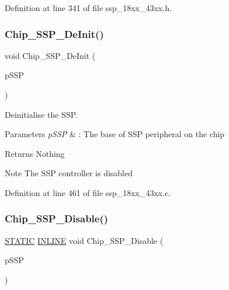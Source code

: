 Definition at line 341 of file ssp\+\_\+18xx\+\_\+43xx.\+h.

\mbox{\label{group___s_s_p__18_x_x__43_x_x_ga48f87506f2fddc1043606eae292b6f16}} 
\subsubsection{\texorpdfstring{Chip\+\_\+\+S\+S\+P\+\_\+\+De\+Init()}{Chip\_SSP\_DeInit()}}
{\footnotesize\ttfamily void Chip\+\_\+\+S\+S\+P\+\_\+\+De\+Init (\begin{DoxyParamCaption}\item[{\hyperlink{struct_l_p_c___s_s_p___t}{L\+P\+C\+\_\+\+S\+S\+P\+\_\+T} $\ast$}]{p\+S\+SP }\end{DoxyParamCaption})}



Deinitialise the S\+SP. 


\begin{DoxyParams}{Parameters}
{\em p\+S\+SP} & \+: The base of S\+SP peripheral on the chip \\
\hline
\end{DoxyParams}
\begin{DoxyReturn}{Returns}
Nothing 
\end{DoxyReturn}
\begin{DoxyNote}{Note}
The S\+SP controller is disabled 
\end{DoxyNote}


Definition at line 461 of file ssp\+\_\+18xx\+\_\+43xx.\+c.

\mbox{\label{group___s_s_p__18_x_x__43_x_x_ga3033c296868595a01dd74ecccaed6090}} 
\subsubsection{\texorpdfstring{Chip\+\_\+\+S\+S\+P\+\_\+\+Disable()}{Chip\_SSP\_Disable()}}
{\footnotesize\ttfamily \hyperlink{group___l_p_c___types___public___macros_ga10b2d890d871e1489bb02b7e70d9bdfb}{S\+T\+A\+T\+IC} \hyperlink{spifi__18xx__43xx_8h_a2eb6f9e0395b47b8d5e3eeae4fe0c116}{I\+N\+L\+I\+NE} void Chip\+\_\+\+S\+S\+P\+\_\+\+Disable (\begin{DoxyParamCaption}\item[{\hyperlink{struct_l_p_c___s_s_p___t}{L\+P\+C\+\_\+\+S\+S\+P\+\_\+T} $\ast$}]{p\+S\+SP }\end{DoxyParamCaption})}



